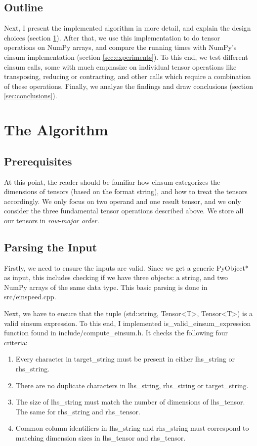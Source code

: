 \documentclass[sigconf]{acmart}
\renewcommand{\texttt}[1]{\begingroup\ttfamily\sloppy\hbadness=10000 #1\endgroup}
\begin{document}
\subsection{Outline}
Next, I present the implemented algorithm in more detail, and explain the design choices (section \ref{sec:algorithm}). After that, we use this implementation to do tensor operations on NumPy arrays, and compare the running times with NumPy's einsum implementation (section \ref{sec:experiments}). To this end, we test different einsum calls, some with much emphasize on individual tensor operations like transposing, reducing or contracting, and other calls which require a combination of these operations.
Finally, we analyze the findings and draw conclusions (section \ref{sec:conclusions}).



\section{The Algorithm}
\label{sec:algorithm}

\subsection{Prerequisites}
At this point, the reader should be familiar how einsum categorizes the dimensions of tensors (based on the format string), and how to treat the tensors accordingly. We only focus on two operand and one result tensor, and we only consider the three fundamental tensor operations described above. We store all our tensors in \em row-major order\em .


\subsection{Parsing the Input}
Firstly, we need to ensure the inputs are valid. Since we get a generic \texttt{PyObject*} as input, this includes checking if we have three objects: a string, and two NumPy arrays of the same data type. This basic parsing is done in \texttt{src/einspeed.cpp}.

Next, we have to ensure that the tuple \texttt{(std::string, Tensor<T>, Tensor<T>)} is a valid einsum expression. To this end, I implemented \texttt{is\_valid\_einsum\_expression} function found in \texttt{include/compute\_einsum.h}. It checks the following four criteria:

\begin{enumerate}
  \item Every character in target\_string must be present in either lhs\_string or rhs\_string.
  \item There are no duplicate characters in lhs\_string, rhs\_string or target\_string.
  \item The size of lhs\_string must match the number of dimensions of lhs\_tensor. The same for rhs\_string and rhs\_tensor.
  \item Common column identifiers in lhs\_string and rhs\_string must correspond to matching dimension sizes in lhs\_tensor and rhs\_tensor.
\end{enumerate}
\end{document}
